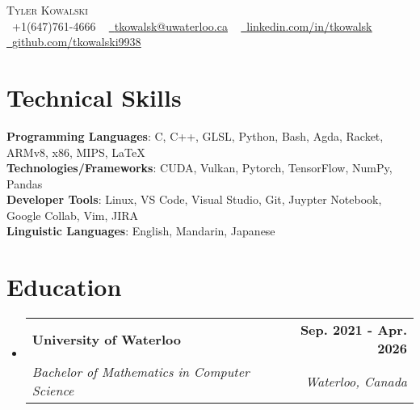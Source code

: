 \documentclass[letterpaper,11pt]{article}
\makeatletter
\newcommand{\resumeSubheading}[4]{
  \vspace{-2pt}\item
    \begin{tabular*}{1.0\textwidth}[t]{l@{\extracolsep{\fill}}r}
      \textbf{#1} & \textbf{\small #2} \\
      \textit{\small#3} & \textit{\small #4} \\
    \end{tabular*}\vspace{-7pt}
}
\newcommand{\resumeSubHeadingListStart}{\begin{itemize}[leftmargin=0.0in, label={}]}
\newcommand{\resumeSubHeadingListEnd}{\end{itemize}}
\makeatother
\begin{document}

\begin{center}
    {\Huge \scshape Tyler Kowalski} \\ \vspace{1pt}
    \bigskip 
    \small \raisebox{-0.1\height}\faPhone\ +1(647)761-4666 ~ \href{mailto:tkowalsk@uwaterloo.ca}{\raisebox{-0.2\height}\faEnvelope\  \underline{tkowalsk@uwaterloo.ca}} ~ 
    \href{https://www.linkedin.com/in/tkowalsk}{\raisebox{-0.2\height}\faLinkedin\ \underline{linkedin.com/in/tkowalsk}}  ~
    \href{https://github.com/tkowalski9938}{\raisebox{-0.2\height}\faGithub\ \underline{github.com/tkowalski9938}}  ~ \\
    \vspace{-8pt}
\end{center}

\section{Technical Skills}
 \begin{itemize}[leftmargin=0.15in, label={}]
    \small{\item{
     \textbf{Programming Languages}{: C, C++, GLSL, Python, Bash, Agda, Racket, ARMv8, x86, MIPS, LaTeX} \\
     \textbf{Technologies/Frameworks}{: CUDA, Vulkan, Pytorch, TensorFlow, NumPy, Pandas} \\
     \textbf{Developer Tools}{: Linux, VS Code, Visual Studio, Git, Juypter Notebook, Google Collab, Vim, JIRA} \\
     \textbf{Linguistic Languages}{: English, Mandarin, Japanese} \\
     }}
 \end{itemize}
 \vspace{-16pt}

\section{Education}
\resumeSubHeadingListStart
\resumeSubheading
{University of Waterloo}{Sep. 2021 - Apr. 2026}{Bachelor of Mathematics in Computer Science}{Waterloo, Canada}
\resumeSubHeadingListEnd
\end{document}
